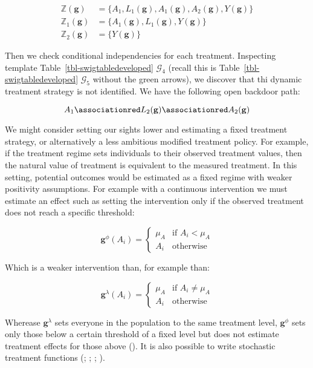 \documentclass[
  single column]{article}
\begin{document}
\[
\begin{aligned}
\mathbb{Z}(\mathbf{g}) &= \{A_1, L_1(\mathbf{g}), A_1(\mathbf{g}), A_2(\mathbf{g}), Y(\mathbf{g})\} \\
\mathbb{Z}_1(\mathbf{g}) &= \{A_1(\mathbf{g}), L_1(\mathbf{g}), Y(\mathbf{g})\} \\
\mathbb{Z}_2(\mathbf{g}) &= \{Y(\mathbf{g})\}
\end{aligned}
\]

Then we check conditional independencies for each treatment. Inspecting
template Table~\ref{tbl-swigtabledeveloped} \(\mathcal{G}_4\) (recall
this is Table~\ref{tbl-swigtabledeveloped} \(\mathcal{G}_5\) without the
green arrows), we discover that thi dynamic treatment strategy is not
identified. We have the following open backdoor path:

\[
A_1 \associationred L_2(\mathbf{g}) \associationred A_2(\mathbf{g})
\]

We might consider setting our sights lower and estimating a fixed
treatment strategy, or alternatively a less ambitious modified treatment
policy. For example, if the treatment regime sets individuals to their
observed treatment values, then the natural value of treatment is
equivalent to the measured treatment. In this setting, potential
outcomes would be estimated as a fixed regime with weaker positivity
assumptions. For example with a continuous intervention we must estimate
an effect such as setting the intervention only if the observed
treatment does not reach a specific threshold:

\[
\mathbf{g}^\phi (A_i) = \begin{cases}  \mu_A & \text{if } A_i < \mu_A \\ 
A_i & \text{otherwise} \end{cases}
\]

Which is a weaker intervention than, for example than:

\[
\mathbf{g}^\lambda (A_i) = \begin{cases}   \mu_A  & \text{if } A_i \neq \mu_A   \\ 
A_i & \text{otherwise} \end{cases}
\]

Wherease \(\mathbf{g}^\lambda\) sets everyone in the population to the
same treatment level, \(\mathbf{g}^\phi\) sets only those below a
certain threshold of a fixed level but does not estimate treatment
effects for those above (). It is also possible to write stochastic treatment functions
(;
;
;
).
\end{document}
